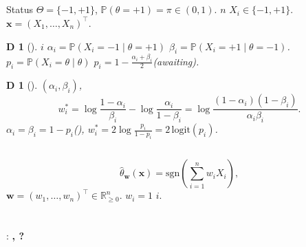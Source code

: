 \documentclass[11pt,a4paper]{article}
\newtheorem{definition}[theorem]Definition
\newcommand{\R}{\mathbb{R}}
\newcommand{\logit}{\mathrm{logit}}
\newcommand{\sgn}{\mathrm{sgn}}
\renewcommand{\P}{\mathbb{P}}
\newcommand{\wv}{\mathbf{w}}
\newcommand{\xv}{\mathbf{x}}
\begin{document}
\subsection{}
Status $\Theta = \{-1,+1\}$, $\P(\theta = +1) = \pi \in (0,1)$.
$n$ $X_i \in \{-1,+1\}$.
 $\xv = (X_1,\ldots,X_n)^\top$.
\begin{definition}[]
 $i$ \emph{} $\alpha_i = \P(X_i = -1 \mid \theta = +1)$
 $\beta_i = \P(X_i = +1 \mid \theta = -1)$.
 $p_i = \P(X_i = \theta \mid \theta)$ $p_i = 1 - \frac{\alpha_i + \beta_i}{2}$(awaiting).
\end{definition}
\begin{definition}[]
 $(\alpha_i,\beta_i)$, \emph{}
\begin{equation}
 w_i^* = \log\frac{1-\alpha_i}{\beta_i} - \log\frac{\alpha_i}{1-\beta_i}
 = \log\frac{(1-\alpha_i)(1-\beta_i)}{\alpha_i\beta_i}.
 \label{eq:logoddsweight}
\end{equation}
 $\alpha_i = \beta_i = 1-p_i$(), $w_i^* = 2\log\frac{p_i}{1-p_i} = 2\,\logit(p_i)$.
\end{definition}
\subsection{}
\begin{equation}
 \hat{\theta}_{\wv}(\xv) = \sgn\!\left(\sum_{i=1}^n w_i X_i\right),
 \label{eq:weightedrule}
\end{equation}
 $\wv = (w_1,\ldots,w_n)^\top \in \R_{\geq 0}^n$.
$w_i = 1$ $i$.
\section{}
: \textbf{, ?}
\end{document}
